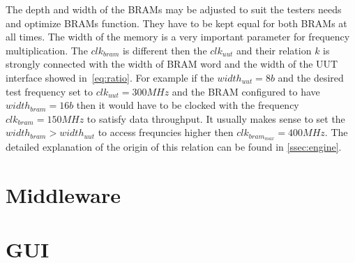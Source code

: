 The depth and width of the BRAMs may be adjusted to suit the testers needs and optimize BRAMs function. They have to be kept equal for both BRAMs at all times. The width of the memory is a very important parameter for frequency multiplication. The $clk_{bram}$ is different then the $clk_{uut}$ and their relation $k$ is strongly connected with the width of BRAM word and the width of the UUT interface showed in~\autoref*{eq:ratio}. For example if the $width_{uut} = 8b$ and the desired test frequency set to $clk_{uut} = 300MHz$ and the BRAM configured to have $width_{bram} = 16b$ then it would have to be clocked with the frequency $clk_{bram} = 150MHz$ to satisfy data throughput. It usually makes sense to set the $width_{bram} > width_{uut}$ to access frequncies higher then $clk_{bram_{max}} = 400 MHz$. The detailed explanation of the origin of this relation can be found in \autoref{ssec:engine}.


\section{Middleware}
\section{GUI}